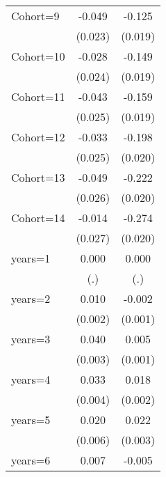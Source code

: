 \begin{table}[htbp]
\begin{tabular}{l*{2}{c}}
\addlinespace
Cohort=9            &      -0.049\sym{**} &      -0.125\sym{***}\\
                    &     (0.023)         &     (0.019)         \\
\addlinespace
Cohort=10           &      -0.028         &      -0.149\sym{***}\\
                    &     (0.024)         &     (0.019)         \\
\addlinespace
Cohort=11           &      -0.043\sym{*}  &      -0.159\sym{***}\\
                    &     (0.025)         &     (0.019)         \\
\addlinespace
Cohort=12           &      -0.033         &      -0.198\sym{***}\\
                    &     (0.025)         &     (0.020)         \\
\addlinespace
Cohort=13           &      -0.049\sym{*}  &      -0.222\sym{***}\\
                    &     (0.026)         &     (0.020)         \\
\addlinespace
Cohort=14           &      -0.014         &      -0.274\sym{***}\\
                    &     (0.027)         &     (0.020)         \\
\addlinespace
years=1             &       0.000         &       0.000         \\
                    &         (.)         &         (.)         \\
\addlinespace
years=2             &       0.010\sym{***}&      -0.002         \\
                    &     (0.002)         &     (0.001)         \\
\addlinespace
years=3             &       0.040\sym{***}&       0.005\sym{***}\\
                    &     (0.003)         &     (0.001)         \\
\addlinespace
years=4             &       0.033\sym{***}&       0.018\sym{***}\\
                    &     (0.004)         &     (0.002)         \\
\addlinespace
years=5             &       0.020\sym{***}&       0.022\sym{***}\\
                    &     (0.006)         &     (0.003)         \\
\addlinespace
years=6             &       0.007         &      -0.005\sym{*}  \\

\end{tabular}
\end{table}
